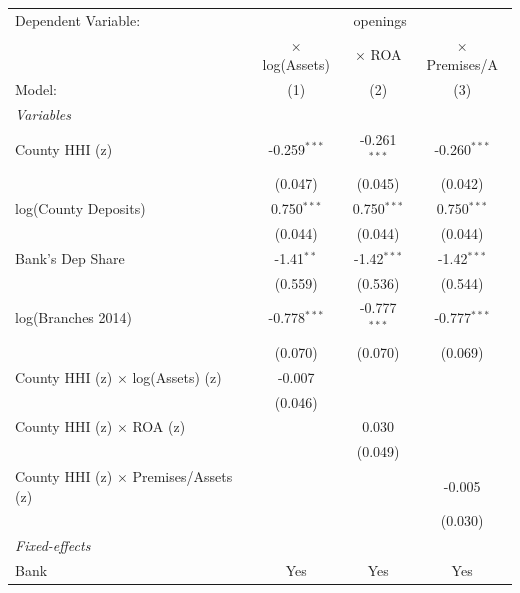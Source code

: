 \begingroup
\centering
\begin{tabular}{lccc}
   \tabularnewline \midrule \midrule
   Dependent Variable: & \multicolumn{3}{c}{openings}\\
                                                & × log(Assets)  & × ROA          & × Premises/A \\   
   Model:                                       & (1)            & (2)            & (3)\\  
   \midrule
   \emph{Variables}\\
   County HHI (z)                               & -0.259$^{***}$ & -0.261$^{***}$ & -0.260$^{***}$\\   
                                                & (0.047)        & (0.045)        & (0.042)\\   
   log(County Deposits)                         & 0.750$^{***}$  & 0.750$^{***}$  & 0.750$^{***}$\\   
                                                & (0.044)        & (0.044)        & (0.044)\\   
   Bank's Dep Share                             & -1.41$^{**}$   & -1.42$^{***}$  & -1.42$^{***}$\\   
                                                & (0.559)        & (0.536)        & (0.544)\\   
   log(Branches 2014)                           & -0.778$^{***}$ & -0.777$^{***}$ & -0.777$^{***}$\\   
                                                & (0.070)        & (0.070)        & (0.069)\\   
   County HHI (z) $\times$ log(Assets) (z)      & -0.007         &                &   \\   
                                                & (0.046)        &                &   \\   
   County HHI (z) $\times$ ROA (z)              &                & 0.030          &   \\   
                                                &                & (0.049)        &   \\   
   County HHI (z) $\times$ Premises/Assets (z)  &                &                & -0.005\\   
                                                &                &                & (0.030)\\   
   \midrule
   \emph{Fixed-effects}\\
   Bank                                         & Yes            & Yes            & Yes\\  

\end{tabular}
